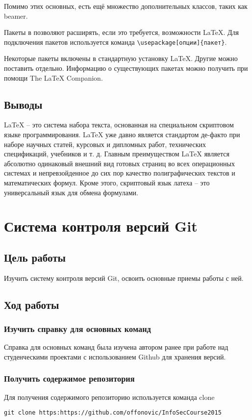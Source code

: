\documentclass[10pt,a4paper]{article}
\begin{document}
Помимо этих основных, есть ещё множество дополнительных классов, таких как beamer.

Пакеты в позволяют расширять, если это требуется, возможности LaTeX. Для подключения пакетов используется команда \verb+\usepackage[опции]{пакет}+.

Некоторые пакеты включены в стандартную установку LaTeX. Другие можно поставить отдельно. Информацию о существующих пакетах можно получить при помощи The LaTeX Companion.
\subsection{Выводы}

\LaTeX{} – это система набора текста, основанная на специальном скриптовом языке программирования. \LaTeX{} уже давно является стандартом де-факто при наборе научных статей, курсовых и дипломных работ, технических спецификаций, учебников и т. д. Главным преимуществом \LaTeX{} является абсолютно одинаковый внешний вид готовых страниц во всех операционных системах и непревзойденное до сих пор качество полиграфических текстов и математических формул. Кроме этого, скриптовый язык латеха – это универсальный язык для обмена формулами.

\section{Система контроля версий Git}
\subsection{Цель работы}
Изучить систему контроля версий Git, освоить основные приемы работы
с ней.
\subsection{Ход работы}
\subsubsection{Изучить справку для основных команд}
Справка для основных команд была изучена автором ранее при работе над студенческими проектами с использованием Github для хранения версий.
\subsubsection{Получить содержимое репозитория}
Для получения содержимого репозиторию используется команда clone
\begin{verbatim}git clone https:https://github.com/offonovic/InfoSecCourse2015
\end{verbatim}
\end{document}
